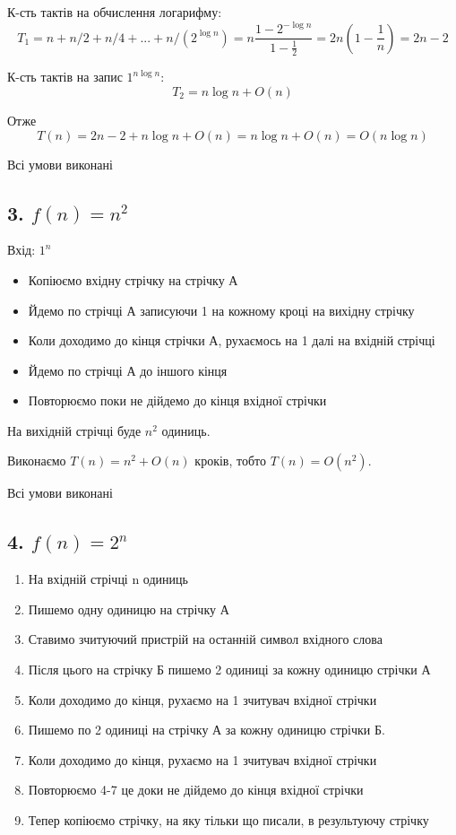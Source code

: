 \documentclass[11pt, a4paper]{article} %
\begin{document}
К-сть тактів на обчислення логарифму:
$$
T_1 = n + n/2 + n/4 + ... + n/(2^{\log n}) = n\frac{1-2^{-\log n}}{1 - \frac{1}{2}} = 2n(1 - \frac{1}{n}) = 2n - 2
$$

К-сть тактів на запис $1^{n \log n}$:
$$
T_2 = n \log n + O(n)
$$

Отже
$$
T(n) = 2n - 2 + n \log n + O(n) = n \log n + O(n) = O(n \log n)
$$

Всі умови виконані \qedsymbol

\subsection*{3. $f(n) = n^2$}

Вхід: $1^n$

\begin{itemize}
    \item Копіюємо вхідну стрічку на стрічку А
    \item Йдемо по стрічці А записуючи 1 на кожному кроці на вихідну стрічку
    \item Коли доходимо до кінця стрічки А, рухаємось на 1 далі на вхідній стрічці
    \item Йдемо по стрічці А до іншого кінця
    \item Повторюємо поки не дійдемо до кінця вхідної стрічки
\end{itemize}
На вихідній стрічці буде $n^2$ одиниць.

Виконаємо $T(n) = n^2 + O(n)$ кроків, тобто $T(n) = O(n^2)$.

Всі умови виконані \qedsymbol

\subsection*{4. $f(n) = 2^n$}

\begin{enumerate}
    \item На вхідній стрічці n одиниць
    \item Пишемо одну одиницю на стрічку А
    \item Ставимо зчитуючий пристрій на останній символ вхідного слова
    \item Після цього на стрічку Б пишемо 2 одиниці за кожну одиницю стрічки А
    \item Коли доходимо до кінця, рухаємо на 1 зчитувач вхідної стрічки
    \item Пишемо по 2 одиниці на стрічку А за кожну одиницю стрічки Б.
    \item Коли доходимо до кінця, рухаємо на 1 зчитувач вхідної стрічки
    \item Повторюємо 4-7 це доки не дійдемо до кінця вхідної стрічки
    \item Тепер копіюємо стрічку, на яку тільки що писали, в результуючу стрічку
\end{enumerate}
\end{document}
